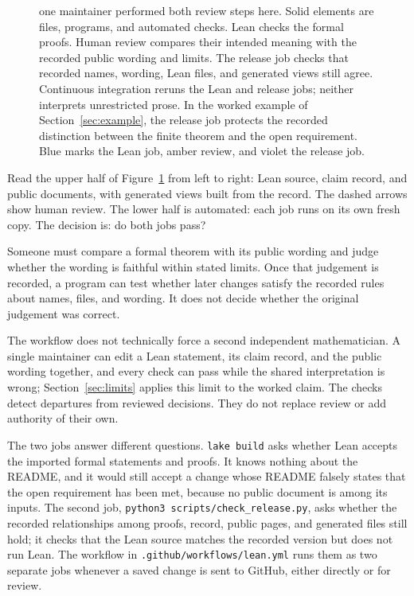 \documentclass[11pt]{article}
\begin{document}
\begin{figure}[!t]
{one maintainer performed both review steps here.  Solid elements are files,
programs, and automated checks.  Lean checks the formal proofs.  Human review
compares their intended meaning with the recorded public wording and limits.
The release job checks that recorded names, wording, Lean files, and generated
views still agree.  Continuous integration reruns the Lean and release jobs; neither
interprets unrestricted prose.  In the worked example of
Section~\ref{sec:example}, the release job protects the recorded distinction
between the finite theorem and the open requirement.  Blue marks the Lean job,
amber review, and violet the release job.}
\label{fig:architecture}
\end{figure}

Read the upper half of Figure~\ref{fig:architecture} from left to right: Lean
source, claim record, and public documents, with generated views built
from the record.  The dashed arrows show human review.  The lower half is
automated: each job runs on its own fresh copy.  The decision is: do both
jobs pass?

Someone must compare a formal theorem with its public wording and judge whether
the wording is faithful within stated limits.  Once that judgement is recorded,
a program can test whether later changes satisfy the recorded rules
about names, files, and wording.  It does not decide whether the original
judgement was correct.

The workflow does not technically force a second independent mathematician.  A
single maintainer can edit a Lean statement, its claim record, and the public
wording together, and every check can pass while the shared interpretation is wrong;
Section~\ref{sec:limits} applies this limit to the worked claim.  The checks
detect departures from reviewed decisions.  They do not replace review or add
authority of their own.

The two jobs answer different questions.  \texttt{lake build} asks whether
Lean accepts the imported formal statements and proofs.  It knows nothing about
the README, and it would still accept a change whose README falsely states that
the open requirement has been met, because no public document is among its inputs.  The
second job, \texttt{python3 scripts/check\_release.py}, asks whether the
recorded relationships among proofs, record, public pages, and generated
files still hold; it checks that the Lean source matches the recorded version
but does not run Lean.  The workflow in
\texttt{.github/workflows/lean.yml} runs them as two separate jobs whenever a
saved change is sent to GitHub, either directly or for review.
\end{document}
